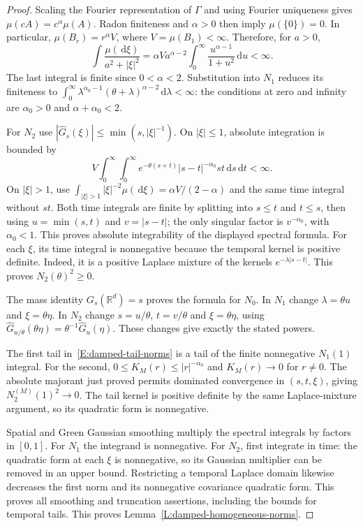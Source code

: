 \documentclass[12pt]{article}
\numberwithin{equation}{section}
\theoremstyle{definition}
\newcommand{\R}{\mathbb{R}}
\newcommand{\ud}{\,\mathrm{d}}
\begin{document}
\begin{proof}
  Scaling the Fourier representation of $\Gamma$ and using Fourier
  uniqueness gives $\mu(cA)=c^\alpha\mu(A)$. Radon finiteness and
  $\alpha>0$ then imply $\mu(\{0\})=0$. In particular,
  $\mu(B_r)=r^\alpha V$, where $V=\mu(B_1)<\infty$.
  Therefore, for $a>0$,
  \[
    \int\frac{\mu(\ud\xi)}{a^2+|\xi|^2}
    =\alpha V a^{\alpha-2}
    \int_0^\infty\frac{u^{\alpha-1}}{1+u^2}\ud u<\infty.
  \]
  The last integral is finite since $0<\alpha<2$.
  Substitution into $N_1$ reduces its finiteness to
  $\int_0^\infty\lambda^{\alpha_0-1}(\theta+\lambda)^{\alpha-2}
  \ud\lambda<\infty$: the conditions at zero and infinity are
  $\alpha_0>0$ and $\alpha+\alpha_0<2$.

  For $N_2$ use
  $|\widehat G_s(\xi)|\le\min(s,|\xi|^{-1})$.
  On $|\xi|\le1$, absolute integration is bounded by
  \[
    V\int_0^\infty\int_0^\infty
    e^{-\theta(s+t)}|s-t|^{-\alpha_0}st\ud s\ud t<\infty.
  \]
  On $|\xi|>1$, use
  $\int_{|\xi|>1}|\xi|^{-2}\mu(\ud\xi)=\alpha V/(2-\alpha)$
  and the same time integral without $st$. Both time integrals are
  finite by splitting into $s\le t$ and $t\le s$, then using
  $u=\min(s,t)$ and $v=|s-t|$; the only singular factor is
  $v^{-\alpha_0}$, with $\alpha_0<1$.
  This proves absolute integrability of the displayed spectral formula.
  For each $\xi$, its time integral is nonnegative because the
  temporal kernel is positive definite. Indeed, it is a positive
  Laplace mixture of the kernels $e^{-\lambda|s-t|}$.
  This proves $N_2(\theta)^2\ge0$.

  The mass identity $G_s(\R^d)=s$ proves the formula for $N_0$.
  In $N_1$ change $\lambda=\theta u$ and $\xi=\theta\eta$.
  In $N_2$ change $s=u/\theta$, $t=v/\theta$ and
  $\xi=\theta\eta$, using
  $\widehat G_{u/\theta}(\theta\eta)=\theta^{-1}\widehat G_u(\eta)$.
  These changes give exactly the stated powers.

  The first tail in~\eqref{E:damped-tail-norms} is a tail of the
  finite nonnegative $N_1(1)$ integral. For the second,
  $0\le K_M(r)\le|r|^{-\alpha_0}$ and $K_M(r)\to0$ for $r\ne0$.
  The absolute majorant just proved permits dominated convergence
  in $(s,t,\xi)$, giving $N_2^{(M)}(1)^2\to0$.
  The tail kernel is positive definite by the same Laplace-mixture
  argument, so its quadratic form is nonnegative.

  Spatial and Green Gaussian smoothing multiply the spectral integrals
  by factors in $[0,1]$. For $N_1$ the integrand is nonnegative.
  For $N_2$, first integrate in time: the quadratic form at each
  $\xi$ is nonnegative, so its Gaussian multiplier can be removed
  in an upper bound. Restricting a temporal Laplace domain likewise
  decreases the first norm and its nonnegative covariance quadratic
  form. This proves all smoothing and truncation assertions, including
  the bounds for temporal tails.
  This proves Lemma~\ref{L:damped-homogeneous-norms}.
\end{proof}
\end{document}
